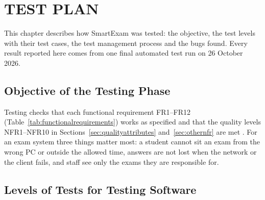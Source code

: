 \chapter{TEST PLAN}
\label{chap:testing}

This chapter describes how SmartExam was tested: the objective, the test levels with their test cases, the test management process and the bugs found. Every result reported here comes from one final automated test run on 26 October 2026.

\section{Objective of the Testing Phase}
\label{sec:test_objective}

Testing checks that each functional requirement FR1--FR12 (Table~\ref{tab:functionalrequirements}) works as specified and that the quality levels NFR1--NFR10 in Sections~\ref{sec:qualityattributes} and~\ref{sec:othernfr} are met \cite{iso25010, sommerville}. For an exam system three things matter most: a student cannot sit an exam from the wrong PC or outside the allowed time, answers are not lost when the network or the client fails, and staff see only the exams they are responsible for.

\section{Levels of Tests for Testing Software}
\label{sec:test_levels}
